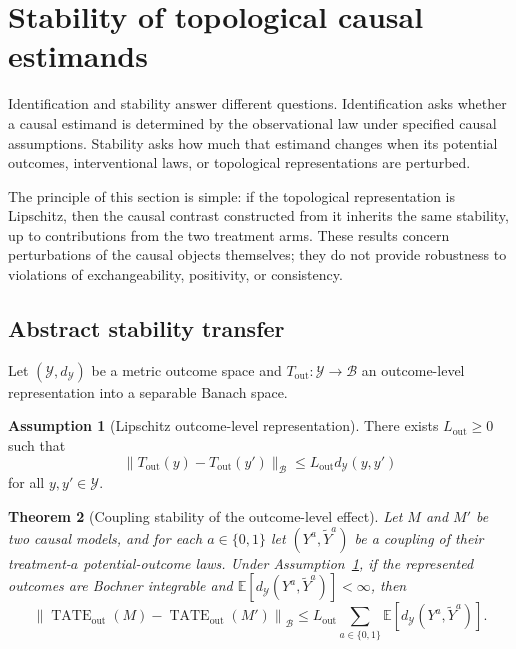 \documentclass[11pt,a4paper]{article}
\theoremstyle{plain}
\newtheorem{theorem}{Theorem}[section]
\theoremstyle{definition}
\newtheorem{assumption}[theorem]{Assumption}
\theoremstyle{remark}
\newcommand{\1}{\mathbbm{1}}
\begin{document}
\section{Stability of topological causal estimands}
\label{sec:stability}

Identification and stability answer different questions. Identification asks whether a causal estimand is determined by the observational law under specified causal assumptions. Stability asks how much that estimand changes when its potential outcomes, interventional laws, or topological representations are perturbed.

The principle of this section is simple: if the topological
representation is Lipschitz, then the causal contrast constructed from it inherits the same stability, up to contributions from the two treatment arms. These results concern perturbations of the causal objects themselves; they do not provide robustness to violations of exchangeability, positivity, or consistency.

\subsection{Abstract stability transfer}
\label{subsec:abstract-stability-transfer}

Let \((\mathcal Y,d_{\mathcal Y})\) be a metric outcome space and \(T_{\mathrm{out}}:\mathcal Y\to\mathcal B\) an outcome-level representation into a separable Banach space.

\begin{assumption}[Lipschitz outcome-level representation]
\label{ass:lipschitz-outcome-T}
There exists \(L_{\mathrm{out}}\geq0\) such that
\[
\|T_{\mathrm{out}}(y)-T_{\mathrm{out}}(y')\|_{\mathcal B}
\leq
L_{\mathrm{out}}d_{\mathcal Y}(y,y')
\]
for all \(y,y'\in\mathcal Y\).
\end{assumption}

\begin{theorem}[Coupling stability of the outcome-level effect]
\label{thm:stability-outcome-tate}
Let \(M\) and \(M'\) be two causal models, and for each
\(a\in\{0,1\}\) let \((Y^a,\widetilde Y^a)\) be a coupling of their treatment-\(a\) potential-outcome laws. Under
Assumption~\ref{ass:lipschitz-outcome-T}, if the represented outcomes are Bochner integrable and
\(\mathbb E[d_{\mathcal Y}(Y^a,\widetilde Y^a)]<\infty\), then
\[
\left\|
\operatorname{TATE}_{\mathrm{out}}(M)
-
\operatorname{TATE}_{\mathrm{out}}(M')
\right\|_{\mathcal B}
\leq
L_{\mathrm{out}}
\sum_{a\in\{0,1\}}
\mathbb E[
d_{\mathcal Y}(Y^a,\widetilde Y^a)
].
\]
\end{theorem}
\end{document}
